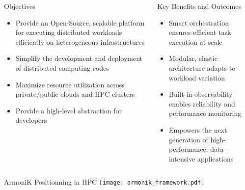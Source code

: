 \begin{frame}[fragile]

  \begin{columns}[T]
    \begin{column}{.47\textwidth}
            \begin{block}{Objectives}
              \begin{itemize}
                \item Provide an Open-Source, scalable platform for executing distributed workloads efficiently on heterogeneous infrastructures
                \item Simplify the development and deployment of distributed computing codes
                \item Maximize resource utilization across private/public clouds and HPC clusters
                \item Provide a high-level abstraction for developers
              \end{itemize}
            \end{block}
    \end{column}
    \begin{column}{.47\textwidth}
          \begin{block}{Key Benefits and Outcomes}
            \begin{itemize}
                \item Smart orchestration ensures efficient task execution at scale
                \item Modular, elastic architecture adapts to workload variation
                \item Built-in observability enables reliability and performance monitoring
                \item Empowers the next generation of high-performance, data-intensive applications
            \end{itemize}
            \vspace{1.25cm}
          \end{block}
    \end{column}
  \end{columns}
  \vfill

  \begin{center}
  \begin{minipage}[T]{.97\textwidth}
  \begin{block}{ArmoniK Positionning in HPC}
    \centering
    \texttt{[image: armonik\_framework.pdf]}
  \end{block}
  \end{minipage}
  \end{center}
  \vfill


\end{frame}
